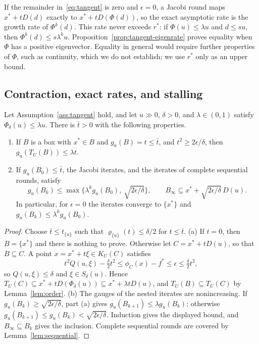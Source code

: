 If the remainder in~\eqref{eq:tangent} is zero and $\epsilon=0$, a Jacobi
round maps $x^*+tD(d)$ exactly to $x^*+tD(\Phi(d))$, so the exact asymptotic
rate is the growth rate of $\Phi^k(d)$. This rate never exceeds $r^*$:
if $\Phi(u)\le\lambda u$ and $d\le su$, then $\Phi^k(d)\le s\lambda^ku$.
Proposition~\ref{prop:tangent-eigenrate} proves equality when $\Phi$ has a
positive eigenvector. Equality in general would require further properties
of $\Phi$, such as continuity, which we do not establish; we use $r^*$ only
as an upper bound.

\subsection{Contraction, exact rates, and stalling}\label{sec:local-rates-contraction}

\begin{theorem}\label{thm:tangent-contraction}
Let Assumption~\ref{ass:tangent} hold, and let $u\gg0$, $\delta>0$, and
$\lambda\in(0,1)$ satisfy $\Phi_\delta(u)\le\lambda u$. There is $\bar t>0$
with the following properties.
\begin{enumerate}[label=(\alph*)]
\item If $B$ is a box with $x^*\in B$ and $g_u(B)=t\le\bar t$, and
  $t^2\ge2\epsilon/\delta$, then $g_u(T_U(B))\le\lambda t$.
\item If $g_u(B_0)\le\bar t$, the Jacobi iterates, and the iterates of
  complete sequential rounds, satisfy
  \[
    g_u(B_k)\le\max\bigl\{\lambda^kg_u(B_0),\ \sqrt{2\epsilon/\delta}\bigr\},
    \qquad B_\infty\subseteq x^*+\sqrt{2\epsilon/\delta}\,D(u).
  \]
  In particular, for $\epsilon=0$ the iterates converge to $\{x^*\}$ and
  $g_u(B_k)\le\lambda^kg_u(B_0)$.
\end{enumerate}
\end{theorem}

\begin{proof}
Choose $\bar t\le t_{\{u\}}$ such that $\varrho_{\{u\}}(t)\le\delta/2$ for
$t\le\bar t$. (a) If $t=0$, then $B=\{x^*\}$ and there is nothing to prove.
Otherwise let $C=x^*+tD(u)$, so that $B\subseteq C$. A point
$x=x^*+t\xi\in K_U(C)$ satisfies
\[
  t^2Q(u,\xi)-\tfrac{\delta}{2}t^2\le\phi_C(x)-f^*\le\epsilon\le\tfrac{\delta}{2}t^2,
\]
so $Q(u,\xi)\le\delta$ and $\xi\in S_\delta(u)$. Hence
$T_U(C)\subseteq x^*+tD(\Phi_\delta(u))\subseteq x^*+\lambda tD(u)$, and
$T_U(B)\subseteq T_U(C)$ by Lemma~\ref{lem:order}. (b) The gauges of the
nested iterates are nonincreasing. If $g_u(B_k)\ge\sqrt{2\epsilon/\delta}$,
part (a) gives $g_u(B_{k+1})\le\lambda g_u(B_k)$; otherwise
$g_u(B_{k+1})\le g_u(B_k)<\sqrt{2\epsilon/\delta}$. Induction gives the
displayed bound, and $B_\infty\subseteq B_k$ gives the inclusion. Complete
sequential rounds are covered by Lemma~\ref{lem:sequential}.
\end{proof}

